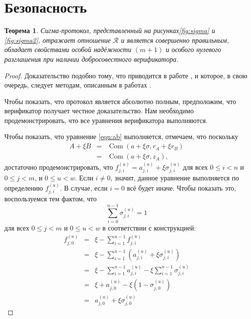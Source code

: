 \documentclass{article}
\newcommand{\com}{\operatorname{Com}}
\newcommand{\sumi}{\sum_{i=0}^{n-1}}
\newtheorem{theorem}{Теорема}
\theoremstyle{definition}
\begin{document}
\section{Безопасность}
\begin{theorem}
Сигма-протокол, представленный на рисунках\ref{fig:sigma} и \ref{fig:sigma2}, отражает отношение $\mathcal{R}$ и является совершенно правильным, обладает свойствами особой надёжности $(m+1)$ и особого нулевого разглашения при наличии добросовестного верификатора.
\end{theorem}

\begin{proof}
Доказательство подобно тому, что приводится в работе \cite{triptych}, и которое, в свою очередь, следует методам, описанным в работах \cite{groth,bootle}.

Чтобы показать, что протокол является абсолютно полным, предположим, что верификатор получает честное доказательство. Нам необходимо продемонстрировать, что все уравнения верификатора выполняются.

Чтобы показать, что уравнение \ref{eqn:ab} выполняется, отмечаем, что поскольку
\begin{eqnarray*}
A + \xi B &=& \com(a + \xi\sigma,r_A + \xi r_B) \\
&=& \com(a + \xi\sigma,z_A),
\end{eqnarray*}
достаточно продемонстрировать, что $f_{j,i}^{(u)} = a_{j,i}^{(u)} + \xi\sigma_{j,i}^{(u)}$ для всех $0 \leq i < n$ и $0 \leq j < m$, и $0 \leq u < w$.
Если $i \neq 0$, значит, данное уравнение выполняется по определению $f_{j,i}^{(u)}$.
В случае, если $i = 0$ всё будет иначе.
Чтобы показать это, воспользуемся тем фактом, что $$\sumi \sigma_{j,i}^{(u)} = 1$$ для всех $0 \leq j < m$ и $0 \leq u < w$ в соответствии с конструкцией:
\begin{eqnarray*}
f_{j,0}^{(u)} &=& \xi - \sum_{i=1}^{n-1} f_{j,i}^{(u)} \\
&=& \xi - \sum_{i=1}^{n-1} \left( a_{j,i}^{(u)} + \xi\sigma_{j,i}^{(u)} \right) \\
&=& \xi - \sum_{i=1}^{n-1} a_{j,i}^{(u)} - \xi\sum_{i=1}^{n-1} \sigma_{j,i}^{(u)} \\
&=& \xi + a_{j,0}^{(u)} - \xi\left( 1 - \sigma_{j,0}^{(u)} \right) \\
&=& a_{j,0}^{(u)} + \xi\sigma_{j,0}^{(u)}
\end{eqnarray*}


\end{proof}
\end{document}
